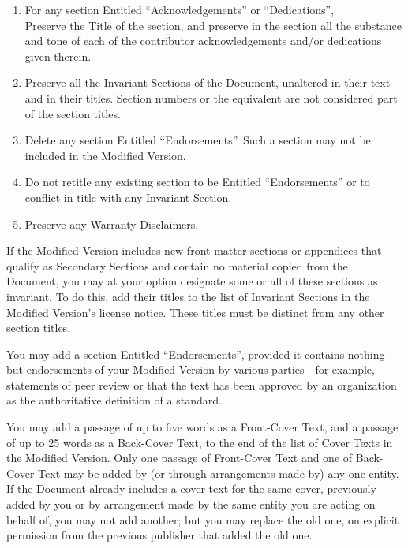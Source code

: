 {\begin{enumerate}
	\item For a\-ny section En\-ti\-tled ``Acknowledgements'' or
		``Dedications'', \\ Preserve the Title of the section, and
		preserve in the section all the substance and tone of each
		of the contributor acknowledgements and/or dedications
		given therein.

	\item Preserve all the Invariant Sections of the Document,
		unaltered in their text and in their titles. Section
		numbers or the equivalent are not considered part of the
		section titles.

	\item Delete any section Entitled ``Endorsements''. Such a section
		may not be included in the Modified Version.

	\item Do not retitle any existing section to be Entitled
		``Endorsements'' or to conflict in title with any Invariant
		Section.

	\item Preserve any Warranty Disclaimers.

\end{enumerate}}

If the Modified Version includes new front-matter sections or appendices
that qualify as Secondary Sections and contain no material copied from the
Document, you may at your option designate some or all of these sections as
invariant. To do this, add their titles to the list of Invariant Sections
in the Modified Version's license notice. These titles must be distinct
from any other section titles.

You may add a section Entitled ``Endorsements'', provided it contains
nothing but endorsements of your Modified Version by various parties---for
example, statements of peer review or that the text has been approved by an
organization as the authoritative definition of a standard.

You may add a passage of up to five words as a Front-Cover Text, and a
passage of up to 25 words as a Back-Cover Text, to the end of the list of
Cover Texts in the Modified Version. Only one passage of Front-Cover Text
and one of Back-Cover Text may be added by (or through arrangements made
by) any one entity. If the Document already includes a cover text for the
same cover, previously added by you or by arrangement made by the same
entity you are acting on behalf of, you may not add another; but you may
replace the old one, on explicit permission from the previous publisher
that added the old one.

